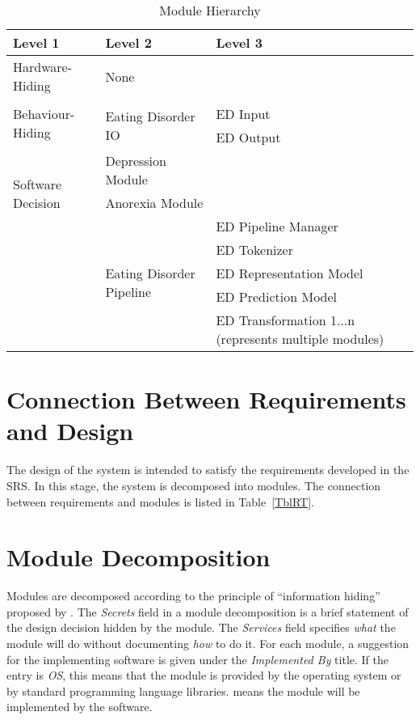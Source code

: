 \documentclass[12pt, titlepage]{article}
\begin{document}
\begin{table}[h!]
\centering
\begin{tabular}{p{} p{} p{}}
\toprule
\textbf{Level 1} & \textbf{Level 2} & \textbf{Level 3}\\
\midrule

{Hardware-Hiding} & None \\
\midrule

\multirow{3}{*}{Behaviour-Hiding} & \\ \cline{2-3}
& \multirow{2}{*}{Eating Disorder IO} & ED Input\\
& & ED Output\\
\midrule

\multirow{3}{*}{Software Decision} 
& Depression Module\\
& Anorexia Module\\ \cline{2-3}
& \multirow{5}{*}{Eating Disorder Pipeline} & ED Pipeline Manager\\
& & ED Tokenizer\\
& & ED Representation Model\\
& & ED Prediction Model\\
& & ED Transformation 1...n (represents multiple modules)\\
\bottomrule

\end{tabular}
\caption{Module Hierarchy}
\label{TblMH}
\end{table}

\section{Connection Between Requirements and Design} \label{SecConnection}

The design of the system is intended to satisfy the requirements developed in
the SRS. In this stage, the system is decomposed into modules. The connection
between requirements and modules is listed in Table~\ref{TblRT}.

\section{Module Decomposition} \label{SecMD}

Modules are decomposed according to the principle of ``information hiding''
proposed by \citet{ParnasEtAl1984}. The \emph{Secrets} field in a module
decomposition is a brief statement of the design decision hidden by the
module. The \emph{Services} field specifies \emph{what} the module will do
without documenting \emph{how} to do it. For each module, a suggestion for the
implementing software is given under the \emph{Implemented By} title. If the
entry is \emph{OS}, this means that the module is provided by the operating
system or by standard programming language libraries.  \emph{\progname{}} means the
module will be implemented by the \progname{} software.
\end{document}
